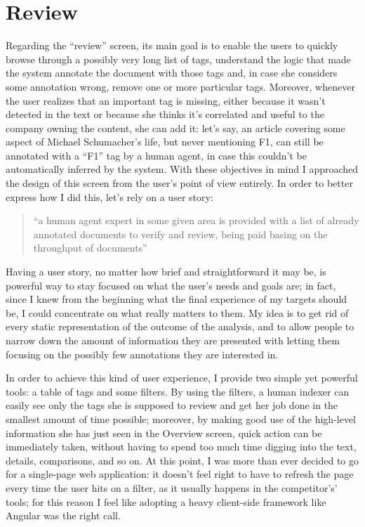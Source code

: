 \documentclass[12pt,oneside,svgnames]{memoir}
\newenvironment{quotationb}%
{\color{maincolor}\begin{leftbar}\begin{quotation}}%
{\end{quotation}\end{leftbar}\ignorespacesafterend}
\begin{document}
\section{Review}\label{review-1}

Regarding the ``review'' screen, its main goal is to enable the users to
quickly browse through a possibly very long list of tags, understand the
logic that made the system annotate the document with those tags and, in
case she considers some annotation wrong, remove one or more particular
tags. Moreover, whenever the user realizes that an important tag is
missing, either because it wasn't detected in the text or because she
thinks it's correlated and useful to the company owning the content, she
can add it: let's say, an article covering some aspect of Michael
Schumacher's life, but never mentioning F1, can still be annotated with
a ``F1'' tag by a human agent, in case this couldn't be automatically
inferred by the system. With these objectives in mind I approached the
design of this screen from the user's point of view entirely. In order
to better express how I did this, let's rely on a user story:

\begin{quotationb}
``a human agent expert in some given area is provided with a list of
already annotated documents to verify and review, being paid basing on
the throughput of documents''
\end{quotationb}

Having a user story, no matter how brief and straightforward it may be,
is powerful way to stay focused on what the user's needs and goals are;
in fact, since I knew from the beginning what the final experience of my
targets should be, I could concentrate on what really matters to them.
My idea is to get rid of every static representation of the outcome of
the analysis, and to allow people to narrow down the amount of
information they are presented with letting them focusing on the
possibly few annotations they are interested in.

In order to achieve this kind of user experience, I provide two simple
yet powerful tools: a table of tags and some filters. By using the
filters, a human indexer can easily see only the tags she is supposed to
review and get her job done in the smallest amount of time possible;
moreover, by making good use of the high-level information she has just
seen in the Overview screen, quick action can be immediately taken,
without having to spend too much time digging into the text, details,
comparisons, and so on. At this point, I was more than ever decided to
go for a single-page web application: it doesn't feel right to have to
refresh the page every time the user hits on a filter, as it usually
happens in the competitor's' tools; for this reason I feel like adopting
a heavy client-side framework like Angular was the right call.
\end{document}
